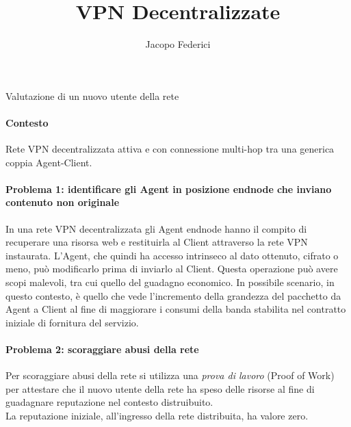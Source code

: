 \documentclass[]{article}
\title{VPN Decentralizzate}
\author{Jacopo Federici}
\begin{document}
	{\Large Valutazione di un nuovo utente della rete}
	\paragraph{Contesto}
	Rete VPN decentralizzata attiva e con connessione multi-hop tra una generica coppia Agent-Client.
	
	\paragraph{Problema 1: identificare gli Agent in posizione endnode che inviano contenuto non originale}
	In una rete VPN decentralizzata gli Agent endnode hanno il compito di recuperare una risorsa web e restituirla al Client attraverso la rete VPN instaurata. L'Agent, che quindi ha accesso intrinseco al dato ottenuto, cifrato o meno, può modificarlo prima di inviarlo al Client. Questa operazione può avere scopi malevoli, tra cui quello del guadagno economico. In possibile scenario, in questo contesto, è quello che vede l'incremento della grandezza del pacchetto da Agent a Client al fine di maggiorare i consumi della banda stabilita nel contratto iniziale di fornitura del servizio.
	
	\paragraph{Problema 2: scoraggiare abusi della rete}
	Per scoraggiare abusi della rete si utilizza una \textit{prova di lavoro} (Proof of Work) per attestare che il nuovo utente della rete ha speso delle risorse al fine di guadagnare reputazione nel contesto distruibuito.\\
	La reputazione iniziale, all'ingresso della rete distribuita, ha valore zero.
	
\end{document}
